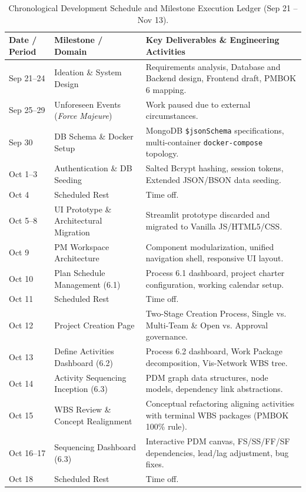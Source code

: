 \begin{table}[H]
\centering
\scriptsize
\renewcommand{\arraystretch}{0.90}
\caption*{Chronological Development Schedule and Milestone Execution Ledger (Sep 21 -- Nov 13).}
\begin{tabularx}{\textwidth}{l p{3.7cm} X}
\toprule
\textbf{Date / Period} & \textbf{Milestone / Domain} & \textbf{Key Deliverables \& Engineering Activities} \\
\midrule
Sep 21--24 & Ideation \& System Design & Requirements analysis, Database and Backend design, Frontend draft, PMBOK 6 mapping. \\
Sep 25--29 & Unforeseen Events (\textit{Force Majeure}) & Work paused due to external circumstances. \\
Sep 30 & DB Schema \& Docker Setup & MongoDB \texttt{\$jsonSchema} specifications, multi-container \texttt{docker-compose} topology. \\
Oct 1--3 & Authentication \& DB Seeding & Salted Bcrypt hashing, session tokens, Extended JSON/BSON data seeding. \\
Oct 4 & Scheduled Rest & Time off. \\
Oct 5--8 & UI Prototype \& Architectural Migration & Streamlit prototype discarded and migrated to Vanilla JS/HTML5/CSS. \\
Oct 9 & PM Workspace Architecture & Component modularization, unified navigation shell, responsive UI layout. \\
Oct 10 & Plan Schedule Management (6.1) & Process 6.1 dashboard, project charter configuration, working calendar setup. \\
Oct 11 & Scheduled Rest & Time off. \\
Oct 12 & Project Creation Page & Two-Stage Creation Process, Single vs. Multi-Team \& Open vs. Approval governance. \\
Oct 13 & Define Activities Dashboard (6.2) & Process 6.2 dashboard, Work Package decomposition, Vis-Network WBS tree. \\
Oct 14 & Activity Sequencing Inception (6.3) & PDM graph data structures, node models, dependency link abstractions. \\
Oct 15 & WBS Review \& Concept Realignment & Conceptual refactoring aligning activities with terminal WBS packages (PMBOK 100\% rule). \\
Oct 16--17 & Sequencing Dashboard (6.3) & Interactive PDM canvas, FS/SS/FF/SF dependencies, lead/lag adjustment, bug fixes. \\
Oct 18 & Scheduled Rest & Time off. \\

\end{tabularx}
\end{table}
